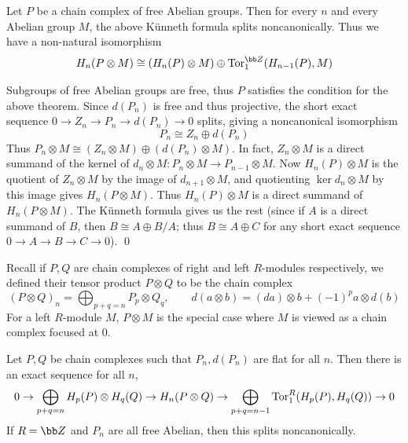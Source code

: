 \eproof

\bthrm[title=Universal coefficient theorem for homology]

    Let $P$ be a chain complex of free Abelian groups.
    Then for every $n$ and every Abelian group $M$, the above K\"unneth formula splits noncanonically.
    Thus we have a non-natural isomorphism
    $$ H_n(P\otimes M) \cong (H_n(P)\otimes M)\oplus\tor_1^\bZ(H_{n-1}(P),M) $$

\ethrm

\bproof

    Subgroups of free Abelian groups are free, thus $P$ satisfies the condition for the above theorem.
    Since $d(P_n)$ is free and thus projective, the short exact sequence $0\to Z_n\to P_n\to d(P_n)\to0$ splits, giving a noncanonical isomorphism
    $$ P_n \cong Z_n\oplus d(P_n) $$
    Thus $P_n\otimes M\cong(Z_n\otimes M)\oplus(d(P_n)\otimes M)$.
    In fact, $Z_n\otimes M$ is a direct summand of the kernel of $d_n\otimes M\colon P_n\otimes M\to P_{n-1}\otimes M$.
    Now $H_n(P)\otimes M$ is the quotient of $Z_n\otimes M$ by the image of $d_{n+1}\otimes M$, and quotienting $\ker d_n\otimes M$ by this image gives $H_n(P\otimes M)$.
    Thus $H_n(P)\otimes M$ is a direct summand of $H_n(P\otimes M)$.
    The K\"unneth formula gives us the rest (since if $A$ is a direct summand of $B$, then $B\cong A\oplus B/A$; thus $B\cong A\oplus C$ for any short exact sequence $0\to A\to B\to C\to0$).
    \qed

\eproof

Recall if $P,Q$ are chain complexes of right and left $R$-modules respectively, we defined their tensor product $P\otimes Q$ to be the chain complex
$$ (P\otimes Q)_n = \bigoplus_{p+q=n}P_p\otimes Q_q,\qquad d(a\otimes b)=(da)\otimes b+(-1)^pa\otimes d(b) $$
For a left $R$-module $M$, $P\otimes M$ is the special case where $M$ is viewed as a chain complex focused at $0$.

\bthrm[title=K\"unneth theorem for complexes]

    Let $P,Q$ be chain complexes such that $P_n,d(P_n)$ are flat for all $n$.
    Then there is an exact sequence for all $n$,
    $$ 0 \to \bigoplus_{p+q=n}H_p(P)\otimes H_q(Q) \to H_n(P\otimes Q) \to \bigoplus_{p+q=n-1}{\rm Tor}^R_1(H_p(P),H_q(Q)) \to 0 $$
    If $R=\bZ$ and $P_n$ are all free Abelian, then this splits noncanonically.

\ethrm

\bproof

